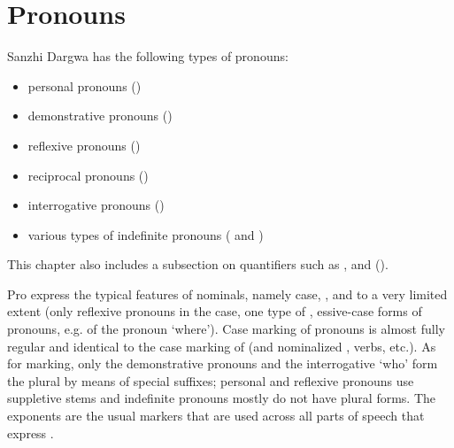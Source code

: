 \chapter{Pronouns}\label{cpt:pronouns}




Sanzhi Dargwa has the following types of pronouns:

\begin{itemize}
	\item	personal pronouns ()
	\item	{}demonstrative pronouns ()
	\item	{}reflexive pronouns ()
	\item	{}reciprocal pronouns ()
	\item	interrogative pronouns ()
	\item	various types of indefinite pronouns ( and )
\end{itemize}

This chapter also includes a subsection on quantifiers such as ,  and  (). 

Pro express the typical features of nominals, namely case, , and to a very limited extent  (only reflexive pronouns in the  case, one type of , essive-case forms of pronouns, e.g. of the pronoun `where'). Case marking of pronouns is almost fully regular and identical to the case marking of  (and nominalized , verbs, etc.). As for  marking, only the demonstrative pronouns and the interrogative `who' form the plural by means of special suffixes; personal and reflexive pronouns use suppletive stems and indefinite pronouns mostly do not have plural forms. The  exponents are the usual markers that are used across all parts of speech that express .


